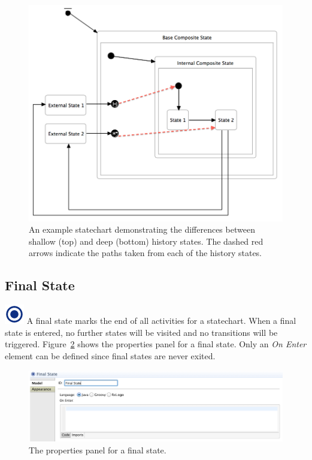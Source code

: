 \documentclass[11pt]{amsart}
\begin{document}
\begin{figure}
\begin{center}
\vspace{.2in}
\centerline {
\includegraphics[width=5in]{StatechartsImages/HistoryExample.png}
}
\caption{An example statechart demonstrating the differences between shallow (top) and deep (bottom) history states. The dashed red arrows indicate the paths taken from each of the history states.}
\label{fig:historyExample}
\end{center}
\end{figure}

\clearpage

\subsection{Final State}
\label{sec:finalState}
\includegraphics[height=.2in]{StatechartsImages/Final-State-32.png}
A final state marks the end of all activities for a statechart. When a final state is entered, no further states will be visited and no transitions will be triggered. Figure~\ref{fig:finalProperties} shows the properties panel for a final state. Only an \emph{On Enter} element can be defined since final states are never exited.

\begin{figure}
\begin{center}
\vspace{.2in}
\centerline {
\includegraphics[width=5in]{StatechartsImages/FinalProperties.png}
}
\caption{The properties panel for a final state.}
\label{fig:finalProperties}
\end{center}
\end{figure}
\end{document}
